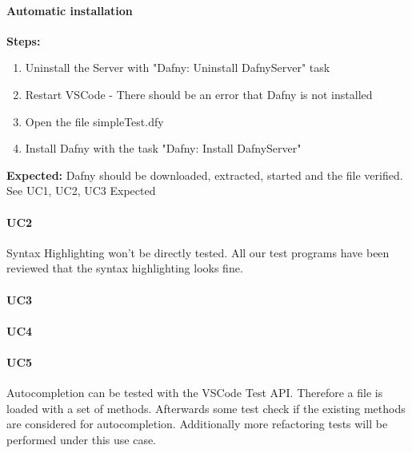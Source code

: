 \paragraph{Automatic installation}
\textbf{\newline Steps:}
\begin{enumerate}
\item Uninstall the Server with "Dafny: Uninstall DafnyServer" task
\item Restart VSCode - There should be an error that Dafny is not installed
\item Open the file simpleTest.dfy
\item Install Dafny with the task "Dafny: Install DafnyServer" 
\end{enumerate}
\textbf{\newline Expected:}
Dafny should be downloaded, extracted, started and the file verified. See UC1, UC2, UC3 Expected


\paragraph{UC2}
Syntax Highlighting won't be directly tested. All our test programs have been reviewed that the syntax highlighting looks fine.  

\paragraph{UC3}


\paragraph{UC4}

\paragraph{UC5}
Autocompletion can be tested with the VSCode Test API. Therefore a file is loaded with a set of methods. Afterwards some test check if the existing methods are considered for autocompletion. Additionally more refactoring tests will be performed under this use case. 
